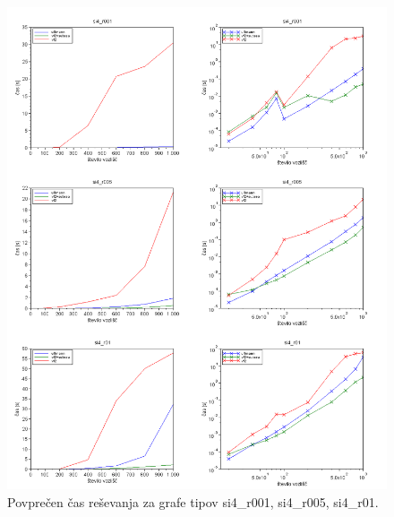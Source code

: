 \documentclass[a4paper, 12pt, ]{book}
\begin{document}
\begin{figure}
\begin{center}
\includegraphics[width=15cm]{img/results2_si4.png}
\end{center}
\caption{Povprečen čas reševanja za grafe tipov si4\_r001, si4\_r005, si4\_r01.}
\label{pic_res2_si4}
\end{figure}
\end{document}
